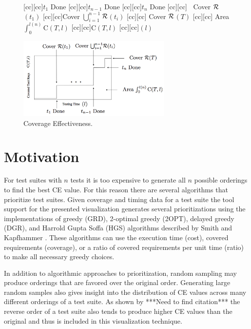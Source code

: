 \documentclass{vgtc}                          %
\begin{document}
\begin{figure}[t]
\centering
{}[cc][cc]{$t_1$ Done}
[cc][cc]{$t_{n-1}$ Done}
[cc][cc]{$t_{n}$ Done}
[cc][cc]{$\;\;$ Cover $\cal{R}$$(t_1)$}
[cc][cc]{Cover $\bigcup_{i = 1}^{n-1}$$ \cal{R}$$(t_i)$}
[cc][cc]{\hspace{10pt} Cover $\cal{R}$$(T)$}
[cc][cc]{\hspace{10pt} Area $\int_0^{l(n)} \mathrm{C}(T, l)$}
[cc][cc]{${\scriptstyle \mathrm{C}(T,l)}$}
[cc][cc]{$(l)$}

\includegraphics[width=3in]{cum_cov_final.png}
\vspace{-.2in}
\caption{Coverage Effectiveness.} %
\vspace{-.25in}
\label{fig:ce}
\end{figure}	

\section{Motivation}

For test suites with $n$ tests it is too expensive to generate all $n\!$ possible orderings to find the best CE value.  For this reason there are several algorithms that prioritize test suites.  Given coverage and timing data for a test suite the tool support for the presented visualization generates several prioritizations using the implementations of greedy (GRD), 2-optimal greedy (2OPT), delayed greedy (DGR), and Harrold Gupta Soffa (HGS) algorithms described by Smith and Kapfhammer \cite{smith:2009}.  These algorithms can use the execution time (cost), covered requirements (coverage), or a ratio of covered requirements per unit time (ratio) to make all necessary greedy choices.

In addition to algorithmic approaches to prioritization, random sampling may produce orderings that are favored over the original order.  Generating large random samples also gives insight into the distribution of CE values across many different orderings of a test suite.  As shown by ***Need to find  citation*** the reverse order of a test suite also tends to produce higher CE values than the original and thus is included in this visualization technique. %
\end{document}
